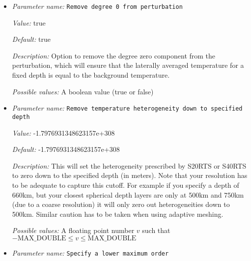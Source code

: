 \begin{itemize}
{\it Default:} 1600.0


{\it Description:} The reference temperature that is perturbed by the spherical harmonic functions. Only used in incompressible models.


{\it Possible values:} A floating point number $v$ such that $0 \leq v \leq \text{MAX\_DOUBLE}$
\item {\it Parameter name:} {\tt Remove degree 0 from perturbation}
\label{parameters:Initial temperature model/S40RTS perturbation/Remove degree 0 from perturbation}


{\it Value:} true


{\it Default:} true


{\it Description:} Option to remove the degree zero component from the perturbation, which will ensure that the laterally averaged temperature for a fixed depth is equal to the background temperature.


{\it Possible values:} A boolean value (true or false)
\item {\it Parameter name:} {\tt Remove temperature heterogeneity down to specified depth}
\label{parameters:Initial temperature model/S40RTS perturbation/Remove temperature heterogeneity down to specified depth}


{\it Value:} -1.7976931348623157e+308


{\it Default:} -1.7976931348623157e+308


{\it Description:} This will set the heterogeneity prescribed by S20RTS or S40RTS to zero down to the specified depth (in meters). Note that your resolution has to be adequate to capture this cutoff. For example if you specify a depth of 660km, but your closest spherical depth layers are only at 500km and 750km (due to a coarse resolution) it will only zero out heterogeneities down to 500km. Similar caution has to be taken when using adaptive meshing.


{\it Possible values:} A floating point number $v$ such that $-\text{MAX\_DOUBLE} \leq v \leq \text{MAX\_DOUBLE}$
\item {\it Parameter name:} {\tt Specify a lower maximum order}
\label{parameters:Initial temperature model/S40RTS perturbation/Specify a lower maximum order}



\end{itemize}
